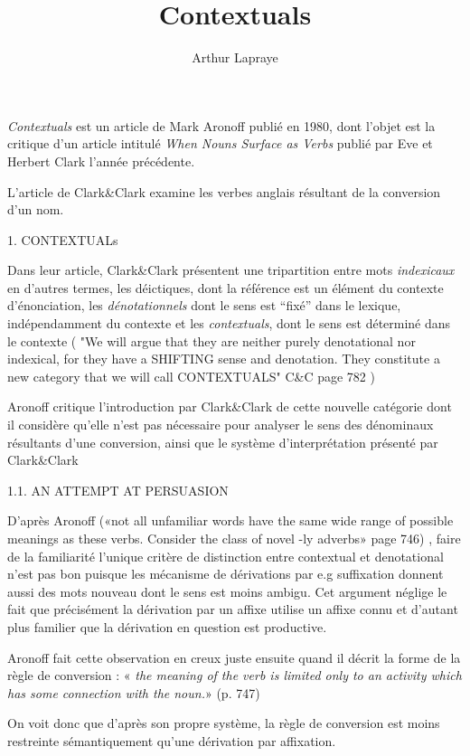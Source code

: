 \documentclass[a4paper,12pt]{article}
\author{Arthur Lapraye}
\title{Contextuals}
\begin{document}
 
 \maketitle
 

 \textit{Contextuals} est un article de Mark Aronoff publié en 1980, dont l'objet est la critique d'un article intitulé 
 \textit{When Nouns Surface as Verbs} publié par Eve et Herbert Clark l'année précédente. 
 
 
 L'article de Clark\&Clark examine les verbes anglais résultant de la conversion d'un nom. 
 
  1. CONTEXTUALs
 
Dans leur article, Clark\&Clark présentent une tripartition entre mots \textit{indexicaux} en d'autres termes, les déictiques, dont la référence est un élément du contexte d'énonciation, les \textit{dénotationnels} dont le sens est ``fixé'' dans le lexique, 
 indépendamment du contexte et les \textit{contextuals}, dont le sens est déterminé dans le contexte ( "We will argue that they are neither purely denotational nor indexical, for they have a SHIFTING sense and denotation. They constitute a new category that we will call CONTEXTUALS" C\&C page 782 )
	
 Aronoff critique l'introduction par Clark\&Clark de cette nouvelle catégorie dont il considère qu'elle n'est pas nécessaire pour analyser le sens des dénominaux résultants d'une conversion,
 ainsi que le système d'interprétation présenté par Clark\&Clark
 
 1.1. AN ATTEMPT AT PERSUASION
 
 
D'après Aronoff («not all unfamiliar words have the same wide range of possible meanings as these
verbs. Consider the class of novel -ly adverbs» page 746) , faire de la familiarité l'unique critère de distinction entre contextual et denotational 
n'est pas bon puisque les mécanisme de dérivations par e.g suffixation donnent aussi des mots nouveau dont le sens est moins ambigu. 
Cet argument néglige le fait que précisément la dérivation par un affixe utilise un affixe connu 
et d'autant plus familier que la dérivation en question est productive.



Aronoff fait cette observation en creux juste ensuite quand il décrit la forme de la règle de conversion : 
« \textit{the meaning of the verb is limited only to an activity which has some connection with the noun.}» (p. 747) 

On voit donc que d'après son propre système, la règle de conversion est moins restreinte sémantiquement qu'une dérivation par affixation. 
\end{document}
